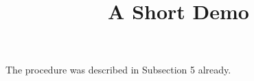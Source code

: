 \documentclass[article]{jss}
\title{A Short Demo}
\begin{document}
The procedure was described in Subsection 5 already.
\end{document}
